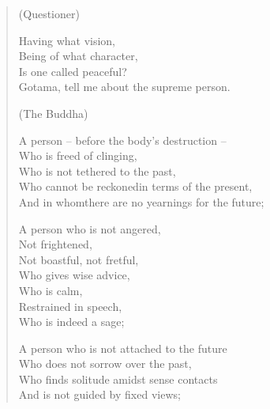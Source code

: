 
\begin{verse}

(Questioner)

 Having what vision,\\
Being of what character,\\
Is one called peaceful?\\
Gotama, tell me about the supreme person.


(The Buddha)

 A person -- before the body's destruction --\\
Who is freed of clinging,\\
Who is not tethered to the past,\\
Who cannot be reckoned\newline in terms of the present,\\
And in whom\newline there are no yearnings for the future;


 A person who is not angered,\\
Not frightened,\\
Not boastful, not fretful,\\
Who gives wise advice,\\
Who is calm,\\
Restrained in speech,\\
Who is indeed a sage;


 A person who is not attached to the future\\
Who does not sorrow over the past,\\
Who finds solitude amidst sense contacts\\
And is not guided by fixed views;


\end{verse}
